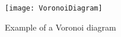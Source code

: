 \begin{figure}[htbp]
	\centering
	\texttt{[image: VoronoiDiagram]}
\caption[Example of a voronoi diagram.]
{Example of a Voronoi diagram}	
\label{fig:VoronoiDiagram}
\end{figure}

% 

% 
% 
% 
